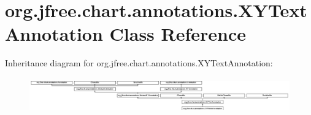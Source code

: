 \hypertarget{classorg_1_1jfree_1_1chart_1_1annotations_1_1_x_y_text_annotation}{}\section{org.\+jfree.\+chart.\+annotations.\+X\+Y\+Text\+Annotation Class Reference}
\label{classorg_1_1jfree_1_1chart_1_1annotations_1_1_x_y_text_annotation}
Inheritance diagram for org.\+jfree.\+chart.\+annotations.\+X\+Y\+Text\+Annotation\+:\begin{figure}[H]
\begin{center}
\leavevmode
\includegraphics[height=1.560758cm]{classorg_1_1jfree_1_1chart_1_1annotations_1_1_x_y_text_annotation}
\end{center}
\end{figure}
